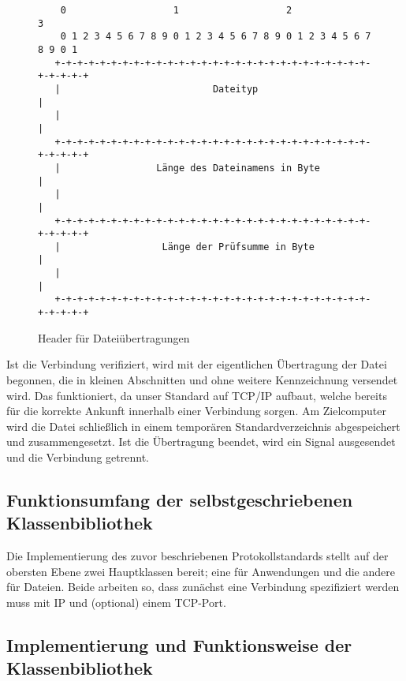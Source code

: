 \begin{figure}[h] 
\begin{lstlisting}
	0                   1                   2                   3
    0 1 2 3 4 5 6 7 8 9 0 1 2 3 4 5 6 7 8 9 0 1 2 3 4 5 6 7 8 9 0 1
   +-+-+-+-+-+-+-+-+-+-+-+-+-+-+-+-+-+-+-+-+-+-+-+-+-+-+-+-+-+-+-+-+
   |                           Dateityp                            |
   |                                                               |
   +-+-+-+-+-+-+-+-+-+-+-+-+-+-+-+-+-+-+-+-+-+-+-+-+-+-+-+-+-+-+-+-+
   |                 Länge des Dateinamens in Byte                 |
   |                                                               |
   +-+-+-+-+-+-+-+-+-+-+-+-+-+-+-+-+-+-+-+-+-+-+-+-+-+-+-+-+-+-+-+-+
   |                  Länge der Prüfsumme in Byte                  |
   |                                                               |
   +-+-+-+-+-+-+-+-+-+-+-+-+-+-+-+-+-+-+-+-+-+-+-+-+-+-+-+-+-+-+-+-+
\end{lstlisting}
\caption{Header für Dateiübertragungen}
\label{Datei_Header}
\end{figure}

Ist die Verbindung verifiziert, wird mit der eigentlichen Übertragung der Datei begonnen, die in kleinen Abschnitten und ohne weitere Kennzeichnung versendet wird.
Das funktioniert, da unser Standard auf TCP/IP aufbaut, welche bereits für die korrekte Ankunft innerhalb einer Verbindung sorgen.
Am Zielcomputer wird die Datei schließlich in einem temporären Standardverzeichnis abgespeichert und zusammengesetzt.
Ist die Übertragung beendet, wird ein Signal ausgesendet und die Verbindung getrennt.
\subsection{Funktionsumfang der selbstgeschriebenen Klassenbibliothek}
Die Implementierung des zuvor beschriebenen Protokollstandards stellt auf der obersten Ebene zwei Hauptklassen bereit; eine für Anwendungen und die andere für Dateien.
Beide arbeiten so, dass zunächst eine Verbindung spezifiziert werden muss mit IP und (optional) einem TCP-Port.
\subsection{Implementierung und Funktionsweise der Klassenbibliothek}

%